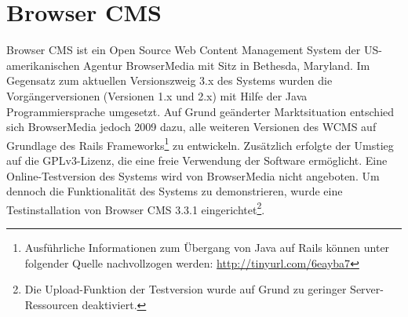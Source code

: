 \section{Browser CMS}
Browser CMS ist ein Open Source Web Content Management System der US-amerikanischen Agentur BrowserMedia mit Sitz in Bethesda, Maryland. Im Gegensatz zum aktuellen Versionszweig 3.x des Systems wurden die Vorgängerversionen (Versionen 1.x und 2.x) mit Hilfe der Java Programmiersprache umgesetzt.
Auf Grund geänderter Marktsituation entschied sich BrowserMedia jedoch 2009 dazu, alle weiteren Versionen des WCMS auf Grundlage des Rails Frameworks\footnote{Ausführliche Informationen zum Übergang von Java auf Rails können unter folgender Quelle nachvollzogen werden: \href{http://tinyurl.com/6eayba7
}{http://tinyurl.com/6eayba7}} zu entwickeln. Zusätzlich erfolgte der Umstieg auf die GPLv3-Lizenz, die eine freie Verwendung der Software ermöglicht.
Eine Online-Testversion des Systems wird von BrowserMedia nicht angeboten. Um dennoch die Funktionalität des Systems zu demonstrieren, wurde eine Testinstallation von Browser CMS 3.3.1 eingerichtet\footnote{Die Upload-Funktion der Testversion wurde auf Grund zu geringer Server-Ressourcen deaktiviert.}.
